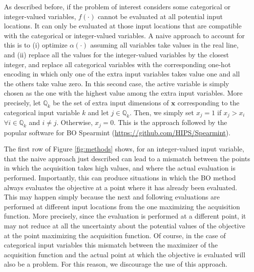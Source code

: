 As described before, if the problem of interest considers some categorical or integer-valued variables, $f(\cdot)$
cannot be evaluated at all potential input locations. It can only be evaluated at those input locations that are
compatible with the categorical or integer-valued variables. A naive approach to account for this
is to (i) optimize $\alpha(\cdot)$ assuming all variables take values in the real line, and (ii) replace all
the values for the integer-valued variables by the closest integer, and replace all categorical  variables
with the corresponding one-hot encoding in which only one of the extra input variables takes value one and
all the others take value zero. In this second case, the active variable is simply chosen as the one
with the highest value among the extra input variables. More precisely, let $\mathds{Q}_k$ be the set of
extra input dimensions of $\mathbf{x}$ corresponding to the categorical input variable $k$ and let $j\in \mathds{Q}_k$. Then, we
simply set $x_j = 1$ if $x_j > x_i$ $\forall i \in \mathds{Q}_k$ and $i \neq j$. Otherwise, $x_j = 0$. This is the
approach followed by the popular software for BO Spearmint ({\small \url{https://github.com/HIPS/Spearmint}}).

The first row of Figure \ref{fig:methods} shows, for an integer-valued input variable, that the naive approach
just described can lead to a mismatch between the points in which the acquisition takes high values, and where the actual evaluation
is performed. Importantly, this can produce situations in which the BO method always evaluates the objective
at a point where it has already been evaluated. This may happen simply because the next and following
evaluations are performed at different input locations from the one maximizing the acquisition function.
More precisely, since the evaluation is performed at a different point, it may not reduce at all the
uncertainty about the potential values of the objective at the point maximizing the acquisition function.
Of course, in the case of categorical input variables this mismatch between the maximizer of the acquisition
function and the actual point at which the objective is evaluated will also be a problem. For this reason,
we discourage the use of this approach.

